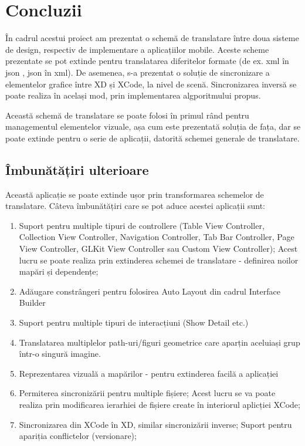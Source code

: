 \chapter{Concluzii}

În cadrul acestui proiect am prezentat o schemă de translatare între doua sisteme de design, respectiv de implementare a aplicațiilor mobile. Aceste scheme prezentate se pot extinde pentru translatarea diferitelor formate (de ex. xml în json , json în xml). De asemenea, s-a prezentat o soluție de sincronizare a elementelor grafice între XD și XCode, la nivel de scenă. Sincronizarea inversă se poate realiza în același mod, prin implementarea algporitmului propus.

Această schemă de translatare se poate folosi în primul rând pentru managementul elementelor vizuale, așa cum este prezentată soluția de fața, dar se poate extinde pentru o serie de aplicații, datorită schemei generale de translatare.

\section{Îmbunătățiri ulterioare}

Această aplicație se poate extinde ușor prin transformarea schemelor de translatare.
Câteva îmbunătățiri care se pot aduce acestei aplicații sunt:

\begin{enumerate}
\item Suport pentru multiple tipuri de controllere (Table View Controller, Collection View Controller, Navigation Controller, Tab Bar Controller, Page View Controller, GLKit View Controller sau Custom View Controller); Acest lucru se poate realiza prin extinderea schemei de translatare - definirea noilor mapări și dependențe;
\item Adăugare constrângeri pentru folosirea Auto Layout din cadrul Interface Builder
\item Suport pentru multiple tipuri de interacțiuni (Show Detail etc.)
\item Translatarea multiplelor path-uri/figuri geometrice care aparțin aceluiași grup într-o singură imagine. 
\item Reprezentarea vizuală a mapărilor - pentru extinderea facilă a aplicației
\item Permiterea sincronizării pentru multiple fișiere; Acest lucru se va poate realiza prin modificarea ierarhiei de fișiere create în interiorul aplicției XCode;
\item Sincronizarea din XCode în XD, similar sincronizării inverse; Suport pentru apariția conflictelor (versionare);
\end{enumerate}


